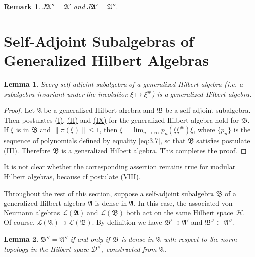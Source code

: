 \documentclass[12pt,b5paper,twoside]{article}
\theoremstyle{takesaki}
\newtheorem{lemma}{Lemma}[section]
\newtheorem*{remark}{Remark}
\numberwithin{equation}{section}
\newcommand{\modcondref}[1]{\hyperref[cond:2.1:#1]{(#1)}}
\begin{document}
\begin{remark}
$J\mathfrak A''=\mathfrak A'$ and $J\mathfrak A'=\mathfrak A''$.
\end{remark}

\section{Self-Adjoint Subalgebras of Generalized Hilbert Algebras}
\label{sec:5}

\begin{lemma}\label{lem:5.1}
Every self-adjoint subalgebra of a generalized Hilbert algebra (i.e. a
subalgebra invariant under the involution $\xi\mapsto\xi^\#$) is a
generalized Hilbert algebra.
\end{lemma}

\begin{proof}
Let $\mathfrak A$ be a generalized Hilbert algebra and $\mathfrak B$ be
  a self-adjoint subalgebra.  Then postulates \modcondref{I}, \modcondref{II} and \modcondref{IX} for the
generalized Hilbert algebra hold for $\mathfrak B$.  If $\xi$ is in
$\mathfrak B$ and $\|\pi(\xi)\|\leq1$, then
$\xi=\lim_{n\to\infty}p_n(\xi\xi^\#)\xi$, where $\{p_n\}$ is the
sequence of polynomials defined by equality \eqref{eq:3.7}, so that
  $\mathfrak B$ satisfies postulate \modcondref{III}.  Therefore $\mathfrak B$ is a
generalized Hilbert algebra.  This completes the proof.
\end{proof}

It is not clear whether the corresponding assertion remains true for
  modular Hilbert algebras, because of postulate \modcondref{VIII}.

Throughout the rest of this section, suppose a self-adjoint subalgebra
$\mathfrak B$ of a generalized Hilbert algebra $\mathfrak A$ is dense
in $\mathfrak A$.  In this case, the associated von Neumann algebras
$\mathcal L(\mathfrak A)$ and $\mathcal L(\mathfrak B)$ both act on the
same Hilbert space $\mathcal H$.  Of course,
$\mathcal L(\mathfrak A)\supset\mathcal L(\mathfrak B)$.  By definition
we have $\mathfrak B'\supset\mathfrak A'$ and
$\mathfrak B''\subset\mathfrak A''$.

\begin{lemma}\label{lem:5.2}
$\mathfrak B''=\mathfrak A''$ if and only if $\mathfrak B$ is dense in
$\mathfrak A$ with respect to the norm topology in the Hilbert space
$\mathcal D^\#$, constructed from $\mathfrak A$.
\end{lemma}
\end{document}
